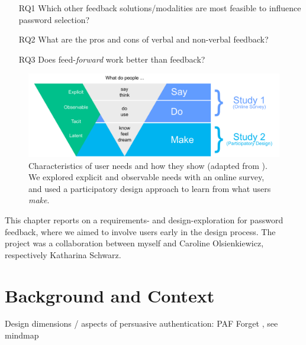 \begin{itemize}
	\item[RQ1] Which other feedback solutions/modalities are most feasible to influence password selection?
	\item[RQ2] What are the pros and cons of verbal and non-verbal feedback?
	\item[RQ3] Does feed-\textit{forward} work better than feedback?
\end{itemize}


\begin{figure}
	\centering
	\includegraphics[width=\linewidth]{figures/co-design/exploration-overview}
	\caption{\label{fig:co-design:exploration-overview} Characteristics of user needs and how they show (adapted from  \cite{Sanders2002ParticipatoryDesign}). We explored explicit and observable needs with an online survey, and used a participatory design approach to learn from what users \textit{make}.}
\end{figure}

This chapter reports on a requirements- and design-exploration for password feedback, where we aimed to involve users early in the design process. The project was a collaboration between myself and Caroline Olsienkiewicz, respectively Katharina Schwarz. 

\section{Background and Context}

Design dimensions / aspects of persuasive authentication: PAF Forget \etal \cite{Forget2007PersuasionEducationSecurity}, see mindmap



		
		


